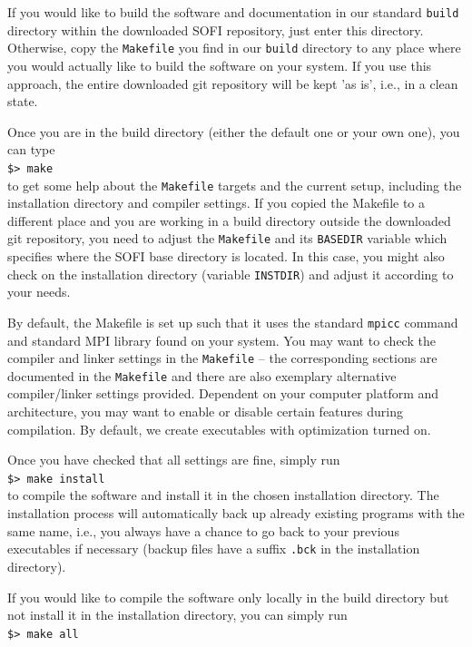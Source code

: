 \documentclass[11pt,english,a4paper]{article}
\newcommand{\RET}{\raisebox{2pt}{\scalebox{0.8}{\Return}}}
\begin{document}
If you would like to build the software and documentation in our standard \texttt{build} directory within the downloaded SOFI repository, just enter this directory. Otherwise, copy the \texttt{Makefile} you find in our \texttt{build} directory to any place where you would actually like to build the software on your system. If you use this approach, the entire downloaded git repository will be kept 'as is', i.e., in a clean state.

Once you are in the build directory (either the default one or your own one), you can type\\
\verb+$> make+\RET{}\\
to get some help about the \texttt{Makefile} targets and the current setup, including the installation directory and compiler settings. If you copied the Makefile to a different place and you are working in a build directory outside the downloaded git repository, you need to adjust the \texttt{Makefile} and its \texttt{BASEDIR} variable which specifies where the SOFI base directory is located. In this case, you might also check on the installation directory (variable \texttt{INSTDIR}) and adjust it according to your needs.

By default, the Makefile is set up such that it uses the standard \texttt{mpicc} command and standard MPI library found on your system. You may want to check the compiler and linker settings in the \texttt{Makefile} -- the corresponding sections are documented in the \texttt{Makefile} and there are also exemplary alternative compiler/linker settings provided. Dependent on your computer platform and architecture, you may want to enable or disable certain features during compilation. By default, we create executables with optimization turned on.

Once you have checked that all settings are fine, simply run\\
\verb+$> make install+\RET{}\\
to compile the software and install it in the chosen installation directory. The installation process will automatically back up already existing programs with the same name, i.e., you always have a chance to go back to your previous executables if necessary (backup files have a suffix \texttt{.bck} in the installation directory).

If you would like to compile the software only locally in the build directory but not install it in the installation directory, you can simply run\\
\verb+$> make all+\RET{}
\end{document}

